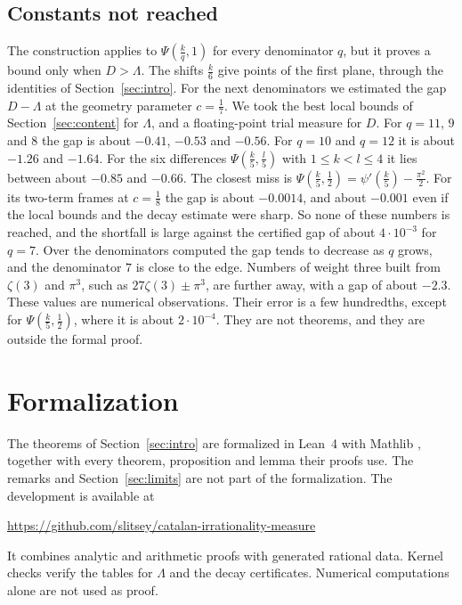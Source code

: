 \documentclass[11pt]{amsart}
\newcommand{\FormalizationURL}{https://github.com/slitsey/catalan-irrationality-measure}
\newcommand{\FormalizationLink}{\url{\FormalizationURL}}
\theoremstyle{definition}
\theoremstyle{remark}
\numberwithin{equation}{section}
\begin{document}
\subsection{Constants not reached}\label{ssec:unreached}
The construction applies to $\Psi(\frac kq,1)$ for every denominator $q$, but it proves a bound only when $D>\Lambda$.
The shifts $\frac k6$ give points of the first plane, through the identities of Section~\ref{sec:intro}. For the next
denominators we estimated the gap $D-\Lambda$ at the geometry parameter $c=\frac17$. We took the best local bounds of
Section~\ref{sec:content} for $\Lambda$, and a floating-point trial measure for $D$. For $q=11$, $9$ and $8$ the gap is
about $-0.41$, $-0.53$ and $-0.56$. For $q=10$ and $q=12$ it is about $-1.26$ and $-1.64$. For the six differences
$\Psi(\frac k5,\frac l5)$ with $1\le k<l\le4$ it lies between about $-0.85$ and $-0.66$. The closest miss is
$\Psi(\frac k5,\frac12)=\psi'(\frac k5)-\frac{\pi^2}2$. For its two-term frames at $c=\frac18$ the gap is about $-0.0014$, and
about $-0.001$ even if the local bounds and the decay estimate were sharp. So none of these numbers is
reached, and the shortfall is large against the certified gap of about $4\cdot10^{-3}$ for $q=7$. Over the denominators
computed the gap tends to decrease as $q$ grows, and the denominator $7$ is close to the edge. Numbers of weight three
built from $\zeta(3)$ and $\pi^3$, such as $27\zeta(3)\pm\pi^3$, are further away, with a gap of about $-2.3$. These
values are numerical observations. Their error is a few hundredths, except for $\Psi(\frac k5,\frac12)$, where it is
about $2\cdot10^{-4}$. They are not theorems, and they are outside the
formal proof.

\section{Formalization}\label{sec:lean}
\raggedbottom

The theorems of Section~\ref{sec:intro} are formalized in Lean~4 \cite{Lean4} with Mathlib \cite{Mathlib}, together with
every theorem, proposition and lemma their proofs use. The remarks and Section~\ref{sec:limits} are not part of the
formalization. The development is available at
\begin{center}
\FormalizationLink
\end{center}
It combines analytic and arithmetic proofs with generated rational data. Kernel checks verify the tables for $\Lambda$ and
the decay certificates. Numerical computations alone are not used as proof.
\end{document}
